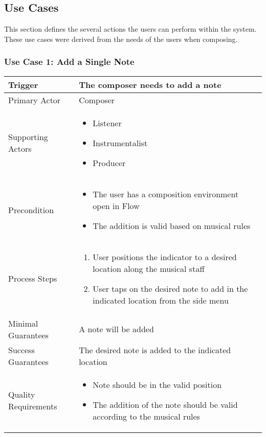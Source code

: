 \subsection{Use Cases}

This section defines the several actions the users can perform within the system. These use cases were derived from the needs of the users when composing. 



\subsubsection{Use Case 1: Add a Single Note}

\begin{tabularx}{\textwidth}{|X|X|}
\hline
Trigger & The composer needs to add a note \\
\hline
Primary Actor & 
Composer \\
\hline
Supporting Actors & 
\begin{itemize}
\item Listener
\item Instrumentalist
\item Producer
\end{itemize} \\
\hline
Precondition & 
\begin{itemize}
\item The user has  a composition environment open in Flow 
\item The addition is valid based on musical rules
\end{itemize} \\
\hline
Process Steps & 
\begin{enumerate}
\item User positions the indicator to a desired location along the musical staff
\item User taps on the desired note to add in the indicated location from the side menu
\end{enumerate} \\
\hline
Minimal Guarantees & 
A note will be added \\
\hline
Success Guarantees & 
The desired note is added to the indicated location \\
\hline
Quality Requirements &  
\begin{itemize}
\item Note should be in the valid position
\item The addition of the note should be valid according to the musical rules
\end{itemize} \\ 
\hline
\end{tabularx}

